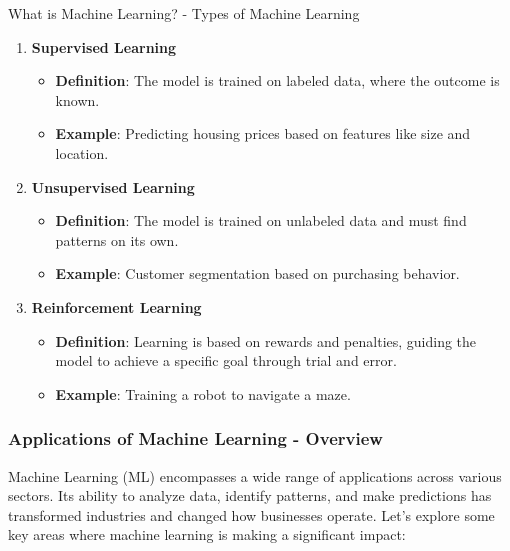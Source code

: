 \documentclass[aspectratio=169]{beamer}
\begin{document}
\begin{frame}[fragile]{What is Machine Learning? - Types of Machine Learning}
    \begin{enumerate}
        \item \textbf{Supervised Learning}
            \begin{itemize}
                \item \textbf{Definition}: The model is trained on labeled data, where the outcome is known.
                \item \textbf{Example}: Predicting housing prices based on features like size and location.
            \end{itemize}

        \item \textbf{Unsupervised Learning}
            \begin{itemize}
                \item \textbf{Definition}: The model is trained on unlabeled data and must find patterns on its own.
                \item \textbf{Example}: Customer segmentation based on purchasing behavior.
            \end{itemize}

        \item \textbf{Reinforcement Learning}
            \begin{itemize}
                \item \textbf{Definition}: Learning is based on rewards and penalties, guiding the model to achieve a specific goal through trial and error.
                \item \textbf{Example}: Training a robot to navigate a maze.
            \end{itemize}
    \end{enumerate}
\end{frame}

\begin{frame}[fragile]
    \frametitle{Applications of Machine Learning - Overview}
    Machine Learning (ML) encompasses a wide range of applications across various sectors. Its ability to analyze data, identify patterns, and make predictions has transformed industries and changed how businesses operate. Let’s explore some key areas where machine learning is making a significant impact:
\end{frame}
\end{document}
